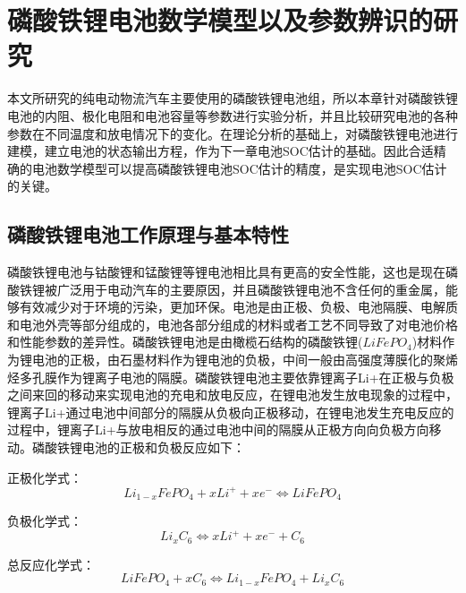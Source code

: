
\chapter{磷酸铁锂电池数学模型以及参数辨识的研究}
本文所研究的纯电动物流汽车主要使用的磷酸铁锂电池组，所以本章针对磷酸铁锂电池的内阻、极化电阻和电池容量等参数进行实验分析，并且比较研究电池的各种参数在不同温度和放电情况下的变化。在理论分析的基础上，对磷酸铁锂电池进行建模，建立电池的状态输出方程，作为下一章电池SOC估计的基础。因此合适精确的电池数学模型可以提高磷酸铁锂电池SOC估计的精度，是实现电池SOC估计的关键。
\section{磷酸铁锂电池工作原理与基本特性}
磷酸铁锂电池与钴酸锂和锰酸锂等锂电池相比具有更高的安全性能，这也是现在磷酸铁锂被广泛用于电动汽车的主要原因，并且磷酸铁锂电池不含任何的重金属，能够有效减少对于环境的污染，更加环保。电池是由正极、负极、电池隔膜、电解质和电池外壳等部分组成的，电池各部分组成的材料或者工艺不同导致了对电池价格和性能参数的差异性。磷酸铁锂电池是由橄榄石结构的磷酸铁锂($LiFeP{O_4}$)材料作为锂电池的正极，由石墨材料作为锂电池的负极，中间一般由高强度薄膜化的聚烯烃多孔膜作为锂离子电池的隔膜。磷酸铁锂电池主要依靠锂离子Li+在正极与负极之间来回的移动来实现电池的充电和放电反应，在锂电池发生放电现象的过程中，锂离子Li+通过电池中间部分的隔膜从负极向正极移动，在锂电池发生充电反应的过程中，锂离子Li+与放电相反的通过电池中间的隔膜从正极方向向负极方向移动。磷酸铁锂电池的正极和负极反应如下：

正极化学式：
\begin{equation}
L{i_{1 - x}}FeP{O_4} + xL{i^ + } + x{e^ - } \Leftrightarrow LiFeP{O_4}
\end{equation}

负极化学式：
\begin{equation}
L{i_x}{C_6} \Leftrightarrow xL{i^ + } + x{e^ - } + {C_6}
\end{equation}

总反应化学式：
\begin{equation}
LiFeP{O_4} + x{C_6} \Leftrightarrow L{i_{1 - x}}FeP{O_4} + L{i_x}{C_6}
\end{equation}


